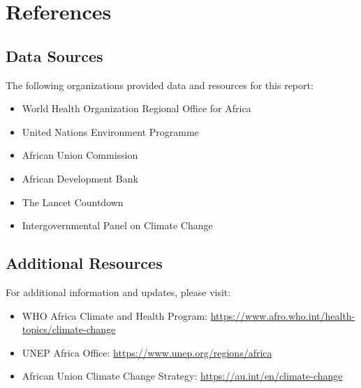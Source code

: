 \section*{References}
\label{sec:references}

\renewcommand{\bibsection}{}



\vspace{1cm}

\subsection*{Data Sources}
The following organizations provided data and resources for this report:

\begin{itemize}
    \item World Health Organization Regional Office for Africa
    \item United Nations Environment Programme
    \item African Union Commission
    \item African Development Bank
    \item The Lancet Countdown
    \item Intergovernmental Panel on Climate Change
\end{itemize}

\subsection*{Additional Resources}
For additional information and updates, please visit:
\begin{itemize}
    \item WHO Africa Climate and Health Program: \url{https://www.afro.who.int/health-topics/climate-change}
    \item UNEP Africa Office: \url{https://www.unep.org/regions/africa}
    \item African Union Climate Change Strategy: \url{https://au.int/en/climate-change}
\end{itemize}
